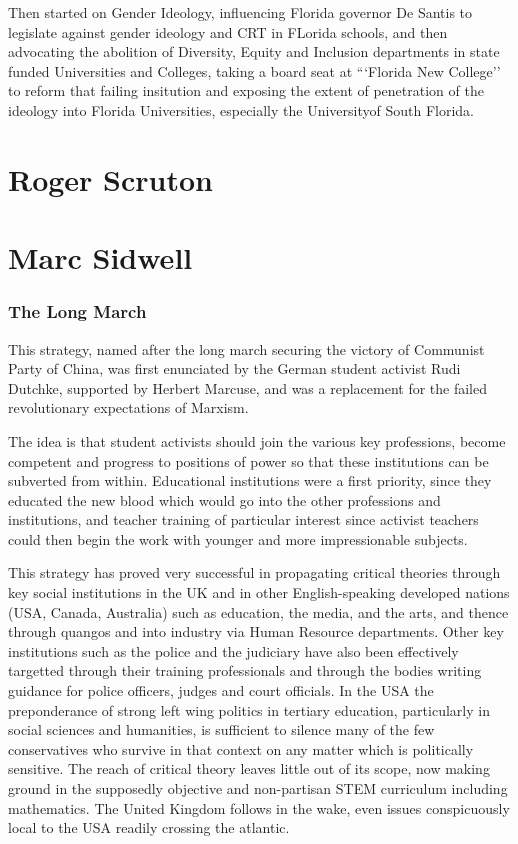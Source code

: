\documentclass[10pt,titlepage]{book}
\begin{document}
Then started on Gender Ideology, influencing Florida governor De Santis to legislate against gender ideology and CRT in FLorida schools, and then advocating the abolition of Diversity, Equity and Inclusion departments in state funded Universities and Colleges, taking a board seat at ```Florida New College'' to reform that failing insitution and exposing the extent of penetration of the ideology into Florida Universities, especially the Universityof South Florida.

\section{Roger Scruton}\label{ScrutonRoger}

\cite{scruton85,scruton15}


\section{Marc Sidwell}\label{SidwellMarc}

\subsubsection{The Long March \cite{sidwell-long}}

This strategy, named after the long march securing the victory of Communist Party of China, was first enunciated by the German student activist Rudi Dutchke, supported by Herbert Marcuse, and was a replacement for the failed revolutionary expectations of Marxism.

The idea is that student activists should join the various key professions, become competent and progress to positions of power so that these institutions can be subverted from within.
Educational institutions were a first priority, since they educated the new blood which would go into the other professions and institutions, and teacher training of particular interest since activist teachers could then begin the work with younger and more impressionable subjects.

This strategy has proved very successful in propagating critical theories through key social institutions in the UK and in other English-speaking developed nations (USA, Canada, Australia) such as education, the media, and the arts, and thence through quangos and into industry via Human Resource departments.
Other key institutions such as the police and the judiciary have also been effectively targetted through their training professionals and through the bodies writing guidance for police officers, judges and court officials.
In the USA the preponderance of strong left wing politics in tertiary education, particularly in social sciences and humanities, is sufficient to silence many of the few conservatives who survive in that context on any matter which is politically sensitive.
The reach of critical theory leaves little out of its scope, now making ground in the supposedly objective and non-partisan STEM curriculum including mathematics.
The United Kingdom follows in the wake, even issues conspicuously local to the USA readily crossing the atlantic.
\end{document}
